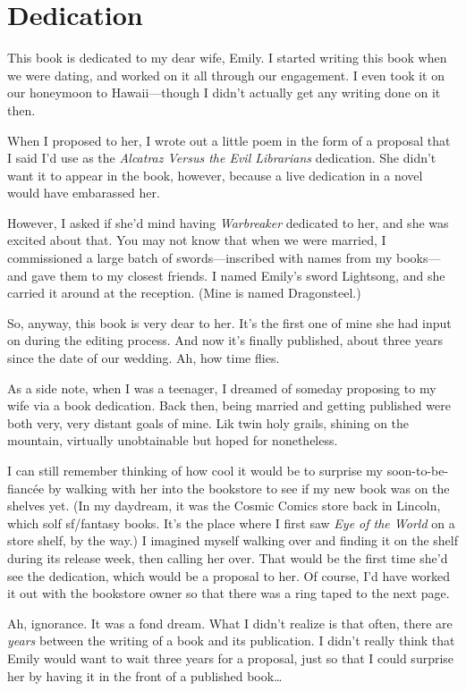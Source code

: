 \chapter{Dedication}

This book is dedicated to my dear wife, Emily. I started writing this book when we were dating, and worked on it all through our engagement. I even took it on our honeymoon to Hawaii---though I didn't actually get any writing done on it then.

When I proposed to her, I wrote out a little poem in the form of a proposal that I said I'd use as the \textit{Alcatraz Versus the Evil Librarians} dedication. She didn't want it to appear in the book, however, because a live dedication in a novel would have embarassed her.

However, I asked if she'd mind having \textit{Warbreaker} dedicated to her, and she was excited about that. You may not know that when we were married, I commissioned a large batch of swords---inscribed with names from my books---and gave them to my closest friends. I named Emily's sword Lightsong, and she carried it around at the reception. (Mine is named Dragonsteel.)

So, anyway, this book is very dear to her. It's the first one of mine she had input on during the editing process. And now it's finally published, about three years since the date of our wedding. Ah, how time flies.

\orn

As a side note, when I was a teenager, I dreamed of someday proposing to my wife via a book dedication. Back then, being married and getting published were both very, very distant goals of mine. Lik twin holy grails, shining on the mountain, virtually unobtainable but hoped for nonetheless.

I can still remember thinking of how cool it would be to surprise my soon-to-be-fianc\'ee by walking with her into the bookstore to see if my new book was on the shelves yet. (In my daydream, it was the Cosmic Comics store back in Lincoln, which solf sf/fantasy books. It's the place where I first saw \textit{Eye of the World} on a store shelf, by the way.) I imagined myself walking over and finding it on the shelf during its release week, then calling her over. That would be the first time she'd see the dedication, which would be a proposal to her. Of course, I'd have worked it out with the bookstore owner so that there was a ring taped to the next page.

Ah, ignorance. It was a fond dream. What I didn't realize is that often, there are \textit{years} between the writing of a book and its publication. I didn't really think that Emily would want to wait three years for a proposal, just so that I could surprise her by having it in the front of a published book\ldots

